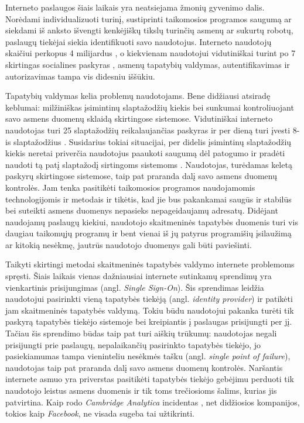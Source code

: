 Interneto paslaugos šiais laikais yra neatsiejama žmonių gyvenimo dalis.
Norėdami individualizuoti turinį, sustiprinti taikomosios programos saugumą ar siekdami
iš anksto išvengti kenkėjiškų tikslų turinčių asmenų ar sukurtų robotų, paslaugų tiekėjai
siekia identifikuoti savo naudotojus. Interneto naudotojų skaičiui perkopus 4 milijardus \cite{InternetUsers2018},
o kiekvienam naudotojui vidutiniškai turint po 7 skirtingas socialines paskyras \cite{Mander2017}, asmenų
tapatybių valdymas, autentifikavimas ir autorizavimas tampa vis didesniu iššūkiu.

Tapatybių valdymas kelia problemų naudotojams. Bene didžiausi atsiradę keblumai:
milžiniškas įsimintinų slaptažodžių kiekis bei sunkumai kontroliuojant savo asmens duomenų sklaidą
skirtingose sistemose. Vidutiniškai interneto naudotojas turi 25 slaptažodžių reikalaujančias paskyras
ir per dieną turi įvesti 8-is slaptažodžius \cite{Florencio2007}. Susidarius tokiai situacijai, per didelis įsimintinų slaptažodžių kiekis neretai 
priverčia naudotojus paaukoti saugumą dėl patogumo
ir pradėti naudoti tą patį slaptažodį sirtingoms sistemoms \cite{Pashalidis2003, Samar1999}. Naudotojas, turėdamas keletą
paskyrų skirtingose sistemose, taip pat praranda dalį savo asmens duomenų kontrolės. Jam tenka pasitikėti
taikomosios programos naudojamomis technologijomis ir metodais ir tikėtis, kad jie bus pakankamai saugūs
ir stabilūs bei suteikti asmens duomenys nepasieks nepageidaujamų adresatų. Didėjant naudojamų paslaugų kiekiui,
naudotojo skaitmeninės tapatybės duomenis turi vis daugiau taikomųjų programų ir bent vienai iš jų
patyrus programišių įsilaužimą ar kitokią nesėkmę, jautrūs naudotojo duomenys gali būti paviešinti. 

Taikyti skirtingi metodai skaitmeninės tapatybės valdymo internete problemoms spręsti. 
Šiais laikais vienas dažniausiai internete sutinkamų sprendimų yra vienkartinis prisijungimas (angl. \textit{Single Sign-On}).
Šis sprendimas leidžia naudotojui pasirinkti
vieną tapatybės tiekėją (angl. \textit{identity provider}) ir patikėti jam skaitmeninės tapatybės valdymą. Tokiu
būdu naudotojui pakanka turėti tik paskyrą tapatybės tiekėjo sistemoje bei kreipiantis į paslaugas prisijungti per jį.
Tačiau šis sprendimo būdas taip pat turi aiškių trūkumų: naudotojas negali prisijungti
prie paslaugų, nepalaikančių pasirinkto tapatybės tiekėjo, jo pasiekiamumas
tampa vieninteliu nesėkmės tašku (angl. \textit{single point of failure}), naudotojas taip pat praranda dalį savo asmens duomenų kontrolės.
Naršantis internete asmuo yra priverstas pasitikėti tapatybės tiekėjo
gebėjimu perduoti tik naudotojo leistus asmens duomenis ir tik toms trečiosioms šalims, kurias jis patvirtina.
Kaip rodo \textit{Cambridge Analytica} incidentas \cite{CambridgeAnalytica}, net didžiosios kompanijos, tokios
kaip \textit{Facebook}, ne visada sugeba tai užtikrinti.

